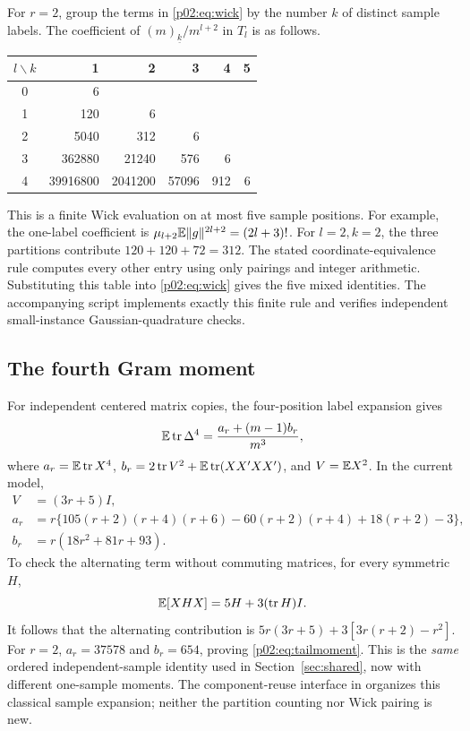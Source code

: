 \documentclass[11pt]{article}
\numberwithin{equation}{section}
\theoremstyle{definition}\newtheorem{definition}[theorem]{Definition}
\theoremstyle{remark}\newtheorem{remark}[theorem]{Remark}
\newcommand{\tr}{\operatorname{tr}}\newcommand{\Ent}{\operatorname{Ent}}
\newcommand{\norm}[1]{\lVert#1\rVert}\newcommand{\ip}[2]{\langle#1,#2\rangle}
\newcommand{\fall}[2]{(#1)_{\underline{#2}}}
\begin{document}
For \(r=2\), group the terms in \eqref{p02:eq:wick} by the number \(k\) of distinct sample labels. The coefficient of \(\fall m k/m^{l+2}\) in \(T_l\) is as follows.
\begin{center}
\begin{tabular}{c r r r r r}
\toprule
\(l\backslash k\)&1&2&3&4&5\\\midrule
0&6&&&&\\
1&120&6&&&\\
2&5040&312&6&&\\
3&362880&21240&576&6&\\
4&39916800&2041200&57096&912&6\\\bottomrule
\end{tabular}
\end{center}
This is a finite Wick evaluation on at most five sample positions. For example, the one-label coefficient is
\(\mu_{l+2}\E\norm g^{2l+2}=(2l+3)!\).
For \(l=2,k=2\), the three partitions contribute \(120+120+72=312\).
The stated coordinate-equivalence rule computes every other entry using only pairings and integer arithmetic. Substituting this table into \eqref{p02:eq:wick} gives the five mixed identities. The accompanying script implements exactly this finite rule and verifies independent small-instance Gaussian-quadrature checks.

\subsection{The fourth Gram moment}
For independent centered matrix copies, the four-position label expansion gives
\[
 \E\tr \Delta^4=\frac{a_r+(m-1)b_r}{m^3},
\]
where \(a_r=\E\tr X^4\),
\(b_r=2\tr V^2+\E\tr(XX'XX')\), and \(V=\mathbb E X^2\).
In the current model,
\begin{align*}
 V&=(3r+5)I,\\
 a_r&=r\{105(r+2)(r+4)(r+6)-60(r+2)(r+4)+18(r+2)-3\},\\
 b_r&=r(18r^2+81r+93).
\end{align*}
To check the alternating term without commuting matrices, for every symmetric \(H\),
\[
 \E[XHX]=5H+3(\tr H)I.
\]
It follows that the alternating contribution is
\(5r(3r+5)+3[3r(r+2)-r^2]\).
For \(r=2\), \(a_r=37578\) and \(b_r=654\), proving \eqref{p02:eq:tailmoment}. This is the \emph{same} ordered independent-sample identity used in
Section~\ref{sec:shared}, now with different one-sample moments.
The component-reuse interface in \cite{Framework} organizes this classical
sample expansion; neither the partition counting nor Wick pairing is new.
\end{document}
